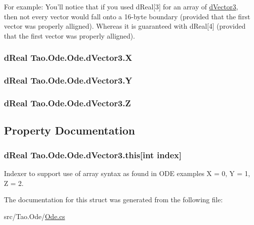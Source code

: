 For example: You'll notice that if you used dReal\mbox{[}3\mbox{]} for an array of \hyperlink{struct_tao_1_1_ode_1_1_ode_1_1d_vector3}{dVector3}, then not every vector would fall onto a 16-\/byte boundary (provided that the first vector was properly alligned). Whereas it is guaranteed with dReal\mbox{[}4\mbox{]} (provided that the first vector was properly alligned). \hypertarget{struct_tao_1_1_ode_1_1_ode_1_1d_vector3_ace6e92820a8a72f1449fec5b01ac55c1}{
\subsubsection[{X}]{\setlength{\rightskip}{0pt plus 5cm}dReal {\bf Tao.Ode.Ode.dVector3.X}}}
\label{struct_tao_1_1_ode_1_1_ode_1_1d_vector3_ace6e92820a8a72f1449fec5b01ac55c1}
\hypertarget{struct_tao_1_1_ode_1_1_ode_1_1d_vector3_ab8e6e790e2825950452c6abc6ce13dfc}{
\subsubsection[{Y}]{\setlength{\rightskip}{0pt plus 5cm}dReal {\bf Tao.Ode.Ode.dVector3.Y}}}
\label{struct_tao_1_1_ode_1_1_ode_1_1d_vector3_ab8e6e790e2825950452c6abc6ce13dfc}
\hypertarget{struct_tao_1_1_ode_1_1_ode_1_1d_vector3_ac487dad890cd7f976cc8cfd622590373}{
\subsubsection[{Z}]{\setlength{\rightskip}{0pt plus 5cm}dReal {\bf Tao.Ode.Ode.dVector3.Z}}}
\label{struct_tao_1_1_ode_1_1_ode_1_1d_vector3_ac487dad890cd7f976cc8cfd622590373}


\subsection{Property Documentation}
\hypertarget{struct_tao_1_1_ode_1_1_ode_1_1d_vector3_acb18e71abfce950a8d13163525918465}{
\subsubsection[{this}]{\setlength{\rightskip}{0pt plus 5cm}dReal Tao.Ode.Ode.dVector3.this\mbox{[}int index\mbox{]}}}
\label{struct_tao_1_1_ode_1_1_ode_1_1d_vector3_acb18e71abfce950a8d13163525918465}


Indexer to support use of array syntax as found in ODE examples X = 0, Y = 1, Z = 2. 



The documentation for this struct was generated from the following file:\begin{DoxyCompactItemize}
\item 
src/Tao.Ode/\hyperlink{_ode_8cs}{Ode.cs}\end{DoxyCompactItemize}
